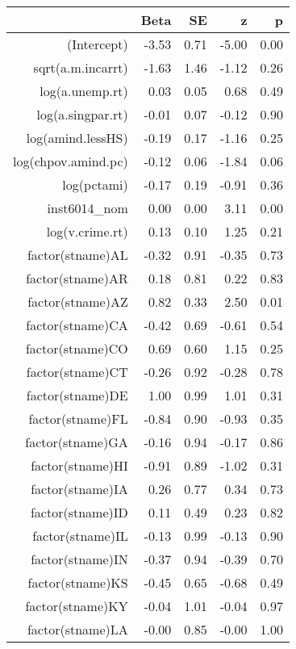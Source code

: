 \begin{table}[ht]
\centering
\begin{tabular}{rrrrr}
  \hline
 & Beta & SE & z & p \\ 
  \hline
(Intercept) & -3.53 & 0.71 & -5.00 & 0.00 \\ 
  sqrt(a.m.incarrt) & -1.63 & 1.46 & -1.12 & 0.26 \\ 
  log(a.unemp.rt) & 0.03 & 0.05 & 0.68 & 0.49 \\ 
  log(a.singpar.rt) & -0.01 & 0.07 & -0.12 & 0.90 \\ 
  log(amind.lessHS) & -0.19 & 0.17 & -1.16 & 0.25 \\ 
  log(chpov.amind.pc) & -0.12 & 0.06 & -1.84 & 0.06 \\ 
  log(pctami) & -0.17 & 0.19 & -0.91 & 0.36 \\ 
  inst6014\_nom & 0.00 & 0.00 & 3.11 & 0.00 \\ 
  log(v.crime.rt) & 0.13 & 0.10 & 1.25 & 0.21 \\ 
  factor(stname)AL & -0.32 & 0.91 & -0.35 & 0.73 \\ 
  factor(stname)AR & 0.18 & 0.81 & 0.22 & 0.83 \\ 
  factor(stname)AZ & 0.82 & 0.33 & 2.50 & 0.01 \\ 
  factor(stname)CA & -0.42 & 0.69 & -0.61 & 0.54 \\ 
  factor(stname)CO & 0.69 & 0.60 & 1.15 & 0.25 \\ 
  factor(stname)CT & -0.26 & 0.92 & -0.28 & 0.78 \\ 
  factor(stname)DE & 1.00 & 0.99 & 1.01 & 0.31 \\ 
  factor(stname)FL & -0.84 & 0.90 & -0.93 & 0.35 \\ 
  factor(stname)GA & -0.16 & 0.94 & -0.17 & 0.86 \\ 
  factor(stname)HI & -0.91 & 0.89 & -1.02 & 0.31 \\ 
  factor(stname)IA & 0.26 & 0.77 & 0.34 & 0.73 \\ 
  factor(stname)ID & 0.11 & 0.49 & 0.23 & 0.82 \\ 
  factor(stname)IL & -0.13 & 0.99 & -0.13 & 0.90 \\ 
  factor(stname)IN & -0.37 & 0.94 & -0.39 & 0.70 \\ 
  factor(stname)KS & -0.45 & 0.65 & -0.68 & 0.49 \\ 
  factor(stname)KY & -0.04 & 1.01 & -0.04 & 0.97 \\ 
  factor(stname)LA & -0.00 & 0.85 & -0.00 & 1.00 \\ 

\end{tabular}
\end{table}
